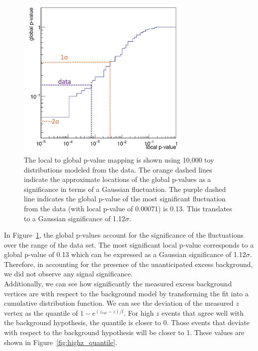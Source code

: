 \begin{figure}[htb]
  \centering
      \includegraphics[width=0.75\textwidth]{pics/results/pvalMap.png}
  \caption[Mapping of local to global p-values]{The local to global p-value mapping is shown using 10,000 toy distributions modeled from the data. The orange dashed lines indicate the approximate locations of the global p-values as a significance in terms of a Gaussian fluctuation. The purple dashed line indicates the global p-value of the most significant fluctuation from the data (with local p-value of 0.00071) is 0.13. This translates to a Gaussian significance of 1.12$\sigma$.}
  \label{fig:pval_map}
\end{figure} 

In Figure~\ref{fig:pval_map}, the global p-values account for the significance of the fluctuations over the range of the data set. The most significant local p-value corresponds to a global p-value of 0.13 which can be expressed as a Gaussian significance of 1.12$\sigma$. Therefore, in accounting for the presence of the unanticipated excess background, we did not observe any signal significance. \\
\indent Additionally, we can see how significantly the measured excess background vertices are with respect to the background model by transforming the fit into a cumulative distribution function. We can see the deviation of the measured $z$ vertex as the quantile of $1-e^{(z_{cut}-z)/l}$. For high $z$ events that agree well with the background hypothesis, the quantile is closer to 0. Those events that deviate with respect to the background hypothesis will be closer to 1. These values are shown in Figure~\ref{fig:highz_quantile}.

